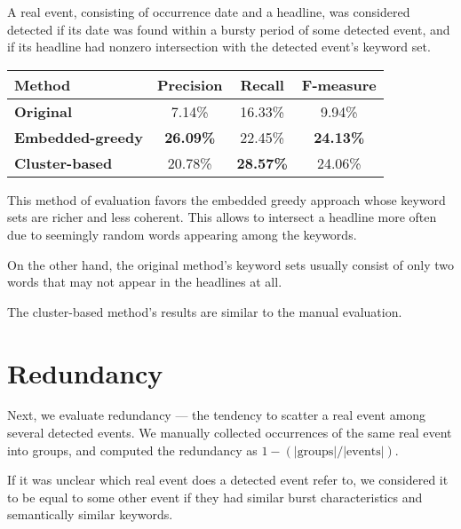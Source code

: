 A real event, consisting of occurrence date and a headline, was considered detected if its date was found within a bursty period of some detected event, and if its headline had nonzero intersection with the detected event's keyword set.

\hspace{\fill}

\begin{minipage}{\linewidth}
\centering
\begin{tabular}{ l c c c }\toprule[1.5pt]
\bf Method 	 & \bf Precision & \bf Recall & \bf F-measure \\ \midrule
\bf Original &  7.14\%     & 16.33\%     &  9.94\% \\
\bf Embedded-greedy   &  \bf 26.09\%     & 22.45\%      &  \bf 24.13\% \\
\bf Cluster-based &  20.78\%     & \bf 28.57\%      &  24.06\% \\ \bottomrule[1.25pt]
\end {tabular}\par
{} \label{tab:title} 
\end{minipage}

\hspace{\fill}

This method of evaluation favors the embedded greedy approach whose keyword sets are richer and less coherent. This allows to intersect a headline more often due to seemingly random words appearing among the keywords.

On the other hand, the original method's keyword sets usually consist of only two words that may not appear in the headlines at all.

The cluster-based method's results are similar to the manual evaluation.

\section{Redundancy} \label{sec:redundancy}

Next, we evaluate redundancy --- the tendency to scatter a real event among several detected events. We manually collected occurrences of the same real event into groups, and computed the redundancy as $1 - (\left| \text{groups} \right| / \left| \text{events} \right|)$.

If it was unclear which real event does a detected event refer to, we considered it to be equal to some other event if they had similar burst characteristics and semantically similar keywords.

